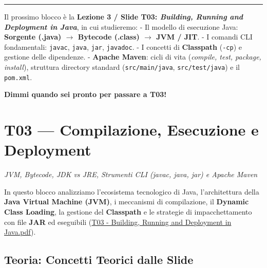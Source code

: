 \documentclass[11pt,a4paper,oneside]{report}
\newcommand{\passthrough}[1]{#1}
\begin{document}
\begin{center}\rule{0.5\linewidth}{0.5pt}\end{center}

\begin{studynote} Il prossimo blocco è la \textbf{Lezione 3 / Slide T03:
\emph{Building, Running and Deployment in Java}}, in cui studieremo: -
Il modello di esecuzione Java: \textbf{Sorgente (.java) \(\rightarrow\)
Bytecode (.class) \(\rightarrow\) JVM / JIT}. - I comandi CLI
fondamentali: \passthrough{\lstinline!javac!},
\passthrough{\lstinline!java!}, \passthrough{\lstinline!jar!},
\passthrough{\lstinline!javadoc!}. - I concetti di \textbf{Classpath}
(\passthrough{\lstinline!-cp!}) e gestione delle dipendenze. -
\textbf{Apache Maven}: cicli di vita (\emph{compile, test, package,
install}), struttura directory standard
(\passthrough{\lstinline!src/main/java!},
\passthrough{\lstinline!src/test/java!}) e il
\passthrough{\lstinline!pom.xml!}.
\end{studynote}

\textbf{Dimmi quando sei pronto per passare a T03!}

\newpage
\chapter[T03 --- Compilazione, Esecuzione e Deployme]{T03 --- Compilazione, Esecuzione e Deployment}
\label{chap:t03}

{\small\sffamily\color{accentblue!80!black}\textit{JVM, Bytecode, JDK vs JRE, Strumenti CLI (javac, java, jar) e Apache Maven}}

\vspace{0.8em}

In questo blocco analizziamo l'ecosistema tecnologico di Java,
l'architettura della \textbf{Java Virtual Machine (JVM)}, i meccanismi
di compilazione, il \textbf{Dynamic Class Loading}, la gestione del
\textbf{Classpath} e le strategie di impacchettamento con file
\textbf{JAR} ed eseguibili
(\href{file:///home/wally/Documenti/GitHub/Programmazione-II/25-26/Teoria-e-Esercitazioni/Slides-20260902/T03\%20-\%20Building,\%20Running\%20and\%20Deployment\%20in\%20Java.pdf}{T03
- Building, Running and Deployment in Java.pdf}).

\section{Teoria: Concetti Teorici dalle
Slide}\label{chap03_teoria-concetti-teorici-dalle-slide}
\end{document}
